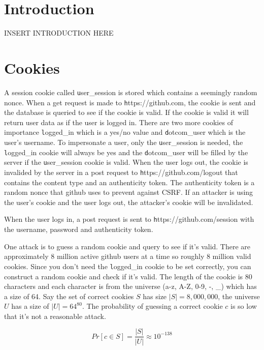 \documentclass[12pt]{article}
\renewcommand{\tt}[1]{\texttt{#1}}
\begin{document}
\maketitle

\section{Introduction}
INSERT INTRODUCTION HERE

\section{Cookies}\label{cookies}
	A session cookie called {\tt user\_session} is stored which contains a seemingly random nonce. When a get request is made to {\tt https://github.com}, the cookie is sent and the database is queried to see if the cookie is valid. If the cookie is valid it will return user data as if the user is logged in. There are two more cookies of importance {\tt logged\_in} which is a yes/no value and {\tt dotcom\_user} which is the user's username. To impersonate a user, only the {\tt user\_session} is needed, the {\tt logged\_in} cookie will always be yes and the {\tt dotcom\_user} will be filled by the server if the {\tt user\_session} cookie is valid. When the user logs out, the cookie is invalided by the server in a post request to {\tt https://github.com/logout} that contains the content type and an authenticity token. The authenticity token is a random nonce that github uses to prevent against CSRF. If an attacker is using the user's cookie and the user logs out, the attacker's cookie will be invalidated.

When the user logs in, a post request is sent to {\tt https://github.com/session} with the username, password and authenticity token.

One attack is to guess a random cookie and query to see if it's valid. There are approximately 8 million active github users at a time so roughly 8 million valid cookies. Since you don't need the {\tt logged\_in} cookie to be set correctly, you can construct a random cookie and check if it's valid. The length of the cookie is 80 characters and each character is from the universe (a-z, A-Z, 0-9, -, \_) which has a size of 64. Say the set of correct cookies $S$  has size $|S| = 8,000,000$, the universe $U$ has a size of $|U| = 64^{80}$. The probability of guessing a correct cookie $c$ is so low that it's not a reasonable attack.

$$Pr[c \in S] = \frac{|S|}{|U|} \approx 10^{-138}$$
\end{document}
